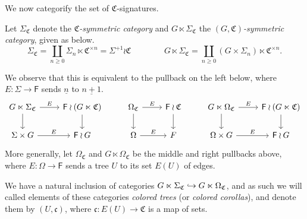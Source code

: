 \documentclass[a4paper,10pt
,draft
]{article}%
\renewcommand{\1}{\ensuremath{\mathbb{id}}}
\begin{document}
We now categorify the set of $\mathfrak C$-signatures.
\begin{definition}
      Let $\Sigma_{\mathfrak C}$ denote the \textit{$\mathfrak C$-symmetric category}
      and $G \ltimes \Sigma_{\mathfrak C}$ the \textit{$(G,\mathfrak C)$-symmetric category}, given as below.      
      \begin{equation}
            \Sigma_{\mathfrak C} = \coprod_{n \geq 0} \Sigma_n \ltimes \mathfrak C^{\times n} = \Sigma^{+1} \wr \mathfrak C
            \qquad \qquad
            G \ltimes \Sigma_{\mathfrak C} = \coprod\limits_{n\geq 0} (G \times \Sigma_n) \ltimes \mathfrak C^{\times n}.
      \end{equation}
      
      We observe that this is equivalent to the pullback on the left below,
      where $E: \Sigma \to \mathsf F$ sends $\underline{n}$ to $\underline{n+1}$.
      \begin{equation}
            \label{COMEGA_B_EQ}
            \begin{tikzcd}
                  G \ltimes \Sigma_{\mathfrak C} \arrow[d] \arrow[r, "E"]
                  &
                  \mathsf F \wr (G \ltimes {\mathfrak C}) \arrow[d]
                  & %
                  \Omega_{\mathfrak C} \arrow[d] \arrow[r, "E"]
                  &
                  \mathsf F \wr \mathfrak C \arrow[d]
                  & %
                  G \ltimes \Omega_{\mathfrak C} \arrow[d] \arrow[r, "E"]
                  &
                  \mathsf F \wr (G \ltimes {\mathfrak C}) \arrow[d]
                  \\
                  \Sigma \times G \arrow[r, "E"]
                  &
                  \mathsf F \wr G
                  & %
                  \Omega \arrow[r, "E"]
                  &
                  F
                  & %
                  \Omega \times G \arrow[r, "E"]
                  &
                  \mathsf F \wr G
            \end{tikzcd}
      \end{equation}
      More generally, let $\Omega_{\mathfrak C}$ and $G \ltimes \Omega_{\mathfrak C}$ be the middle and right pullbacks above,
      where $E: \Omega \to \mathsf F$ sends a tree $U$ to its set $E(U)$ of edges.

      We have a natural inclusion of categories $G \ltimes \Sigma_{\mathfrak C} \hookrightarrow G \ltimes \Omega_{\mathfrak C}$,
      and as such we will called elements of these categories
      \textit{colored trees} (or \textit{colored corollas}),
      and denote them by $(U,\mathfrak c)$, where $\mathfrak c: E(U) \to \mathfrak C$ is a map of sets.
\end{definition}
\end{document}

